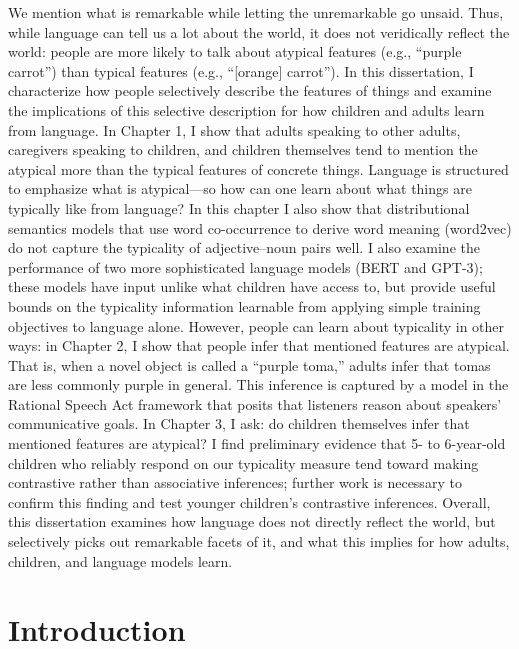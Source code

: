 \documentclass{ucetd}
\begin{document}
\abstract
We mention what is remarkable while letting the unremarkable go unsaid. Thus, while language can tell us a lot about the world, it does not veridically reflect the world: people are more likely to talk about atypical features (e.g., ``purple carrot'') than typical features (e.g., ``[orange] carrot''). In this dissertation, I characterize how people selectively describe the features of things and examine the implications of this selective description for how children and adults learn from language. In Chapter 1, I show that adults speaking to other adults, caregivers speaking to children, and children themselves tend to mention the atypical more than the typical features of concrete things. Language is structured to emphasize what is atypical—so how can one learn about what things are typically like from language? In this chapter I also show that distributional semantics models that use word co-occurrence to derive word meaning (word2vec) do not capture the typicality of adjective–noun pairs well. I also examine the performance of two more sophisticated language models (BERT and GPT-3); these models have input unlike what children have access to, but provide useful bounds on the typicality information learnable from applying simple training objectives to language alone. However, people can learn about typicality in other ways: in Chapter 2, I show that people infer that mentioned features are atypical. That is, when a novel object is called a ``purple toma,'' adults infer that tomas are less commonly purple in general. This inference is captured by a model in the Rational Speech Act framework that posits that listeners reason about speakers' communicative goals. In Chapter 3, I ask: do children themselves infer that mentioned features are atypical? I find preliminary evidence that 5- to 6-year-old children who reliably respond on our typicality measure tend toward making contrastive rather than associative inferences; further work is necessary to confirm this finding and test younger children's contrastive inferences. Overall, this dissertation examines how language does not directly reflect the world, but selectively picks out remarkable facets of it, and what this implies for how adults, children, and language models learn.

\mainmatter
\hypertarget{introduction}{%
\chapter*{Introduction}\label{introduction}}
\end{document}
